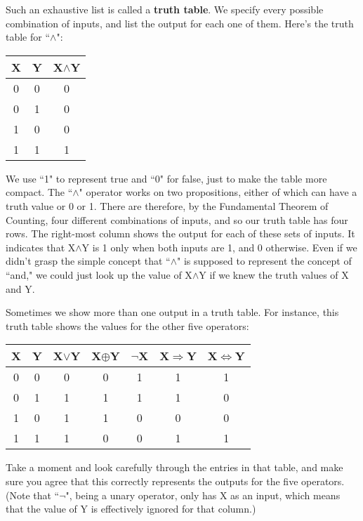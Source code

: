 Such an exhaustive list is called a \textbf{truth table}. We specify every
possible combination of inputs, and list the output for each one of them.
Here's the truth table for ``$\wedge$":
\begin{nobreak}
\begin{center}
\begin{tabular}{c c|c}
X & Y & X$\wedge$Y \\
\hline
0 & 0 & 0 \\
0 & 1 & 0 \\
1 & 0 & 0 \\
1 & 1 & 1 \\
\end{tabular}
\end{center}
\end{nobreak}
We use ``1" to represent true and ``0" for false, just to make the table
more compact. The ``$\wedge$" operator works on two propositions, either of
which can have a truth value or 0 or 1. There are therefore, by the
Fundamental Theorem of Counting, four different combinations of inputs, and
so our truth table has four rows. The right-most column shows the output
for each of these sets of inputs. It indicates that X$\wedge$Y is 1 only
when both inputs are 1, and 0 otherwise. Even if we didn't grasp the simple
concept that ``$\wedge$" is supposed to represent the concept of ``and," we
could just look up the value of X$\wedge$Y if we knew the truth values of X
and Y.

Sometimes we show more than one output in a truth table. For instance, this
truth table shows the values for the other five operators:
\begin{nobreak}
\begin{center}
\begin{tabular}{c c|c c c c c}
X & Y & X$\vee$Y & X$\oplus$Y & $\neg$X & X$\Rightarrow$Y &
X$\Leftrightarrow$Y \\
\hline
0 & 0 & 0 & 0 & 1 & 1 & 1 \\
0 & 1 & 1 & 1 & 1 & 1 & 0 \\
1 & 0 & 1 & 1 & 0 & 0 & 0 \\
1 & 1 & 1 & 0 & 0 & 1 & 1 \\
\end{tabular}
\end{center}
\end{nobreak}
Take a moment and look carefully through the entries in that table, and
make sure you agree that this correctly represents the outputs for the five
operators. (Note that ``$\neg$", being a unary operator, only has X as an
input, which means that the value of Y is effectively ignored for that
column.)

